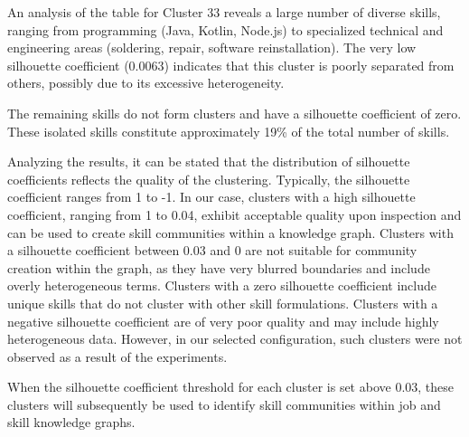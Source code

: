 
An analysis of the table for Cluster 33 reveals a large number of
diverse skills, ranging from programming (Java, Kotlin, Node.js) to
specialized technical and engineering areas (soldering, repair, software
reinstallation). The very low silhouette coefficient (0.0063) indicates
that this cluster is poorly separated from others, possibly due to its
excessive heterogeneity.

The remaining skills do not form clusters and have a silhouette
coefficient of zero. These isolated skills constitute approximately 19\%
of the total number of skills.

Analyzing the results, it can be stated that the distribution of
silhouette coefficients reflects the quality of the clustering.
Typically, the silhouette coefficient ranges from 1 to -1. In our case,
clusters with a high silhouette coefficient, ranging from 1 to 0.04,
exhibit acceptable quality upon inspection and can be used to create
skill communities within a knowledge graph. Clusters with a silhouette
coefficient between 0.03 and 0 are not suitable for community creation
within the graph, as they have very blurred boundaries and include
overly heterogeneous terms. Clusters with a zero silhouette coefficient
include unique skills that do not cluster with other skill formulations.
Clusters with a negative silhouette coefficient are of very poor quality
and may include highly heterogeneous data. However, in our selected
configuration, such clusters were not observed as a result of the
experiments.

When the silhouette coefficient threshold for each cluster is set above
0.03, these clusters will subsequently be used to identify skill
communities within job and skill knowledge graphs.

